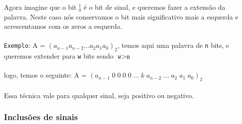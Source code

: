 \documentclass[12pt, onecolumn]{article}
\begin{document}
	Agora imagine que o bit $_0^1$ é o bit de sinal, e queremos fazer a
	extensão da palavra. Neste caso nós conservamos o bit mais
	significativo mais a esquerda e acrescentamos com os zeros a esquerda.\\
	\\
	\texttt{Exemplo}: A = $(a_{n-1} a_{n-2} ... a_2 a_1 a_0)_2$, temos aqui
	uma palavra de \texttt{n} bits, e queremos extender para \texttt{w} bits
	sendo $\texttt{w} > \texttt{n}$\\
	\\
	logo, temos o seguinte: 
	A = $(a_{n-1}\;0\;0\;0\;0\;...\;k\;a_{n-2}\;...\;a_2\;a_1\;a_0)_2$\\
	\\
	Essa técnica vale para qualquer sinal, seja positivo ou negativo.
	
		\subsubsection{\centering Inclusões de sinais}
	
\end{document}
